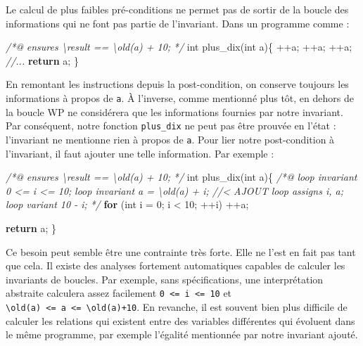 \documentclass[12pt,francais,]{scrbook}
\newenvironment{Shaded}{}{}
\newcommand{\KeywordTok}[1]{\textcolor[rgb]{0.00,0.44,0.13}{\textbf{{#1}}}}
\newcommand{\DataTypeTok}[1]{\textcolor[rgb]{0.56,0.13,0.00}{{#1}}}
\newcommand{\DecValTok}[1]{\textcolor[rgb]{0.25,0.63,0.44}{{#1}}}
\newcommand{\CommentTok}[1]{\textcolor[rgb]{0.38,0.63,0.69}{\textit{{#1}}}}
\newcommand{\NormalTok}[1]{{#1}}
\newenvironment{zdsblock}[1]{%
  \tcolorbox[beamer,%
    noparskip,breakable,
    colback=LightBlue,colframe=DarkBlue,%
    colbacklower=DarkBlue,%
    title=#1]
}{\endtcolorbox}
\begin{document}
\clearpage

Le calcul de plus faibles pré-conditions ne permet pas de sortir de la
boucle des informations qui ne font pas partie de l'invariant. Dans un
programme comme :

\begin{footnotesize}\begin{Shaded}
\begin{Highlighting}[]
\CommentTok{/*@}
\CommentTok{    ensures \textbackslash{}result == \textbackslash{}old(a) + 10;}
\CommentTok{*/}
\DataTypeTok{int} \NormalTok{plus_dix(}\DataTypeTok{int} \NormalTok{a)\{}
    \NormalTok{++a;}
    \NormalTok{++a;}
    \NormalTok{++a;}
    \CommentTok{//...}
    \KeywordTok{return} \NormalTok{a;}
\NormalTok{\}}
\end{Highlighting}
\end{Shaded}\end{footnotesize}

En remontant les instructions depuis la post-condition, on conserve
toujours les informations à propos de \texttt{a}. À l'inverse, comme
mentionné plus tôt, en dehors de la boucle WP ne considérera que les
informations fournies par notre invariant. Par conséquent, notre
fonction \texttt{plus\_dix} ne peut pas être prouvée en l'état :
l'invariant ne mentionne rien à propos de \texttt{a}. Pour lier notre
post-condition à l'invariant, il faut ajouter une telle information. Par
exemple :

\begin{footnotesize}\begin{Shaded}
\begin{Highlighting}[]
\CommentTok{/*@}
\CommentTok{    ensures \textbackslash{}result == \textbackslash{}old(a) + 10;}
\CommentTok{*/}
\DataTypeTok{int} \NormalTok{plus_dix(}\DataTypeTok{int} \NormalTok{a)\{}
    \CommentTok{/*@}
\CommentTok{        loop invariant 0 <= i <= 10;}
\CommentTok{        loop invariant a = \textbackslash{}old(a) + i; //< AJOUT}
\CommentTok{        loop assigns i, a;}
\CommentTok{        loop variant 10 - i;}
\CommentTok{    */}
    \KeywordTok{for} \NormalTok{(}\DataTypeTok{int} \NormalTok{i = }\DecValTok{0}\NormalTok{; i < }\DecValTok{10}\NormalTok{; ++i)}
        \NormalTok{++a;}

    \KeywordTok{return} \NormalTok{a;}
\NormalTok{\}}
\end{Highlighting}
\end{Shaded}\end{footnotesize}

\begin{zdsblock}{Remarque}
  Ce besoin peut semble être une
  contrainte très forte. Elle ne l'est en fait pas tant que
  cela. Il existe des analyses fortement automatiques capables de
  calculer les invariants de boucles. Par exemple, sans
  spécifications, une interprétation abstraite calculera assez
  facilement \texttt{0\ \textless{}=\ i\ \textless{}=\ 10} et 
  \texttt{\textbackslash{}old(a)\ \textless{}=\ a\ \textless{}=\ \textbackslash{}old(a)+10}.
  En revanche, il est souvent bien plus difficile de calculer
  les relations qui existent entre des variables différentes qui
  évoluent dans le même programme, par exemple l'égalité
  mentionnée par notre invariant ajouté.
\end{zdsblock}
\end{document}

